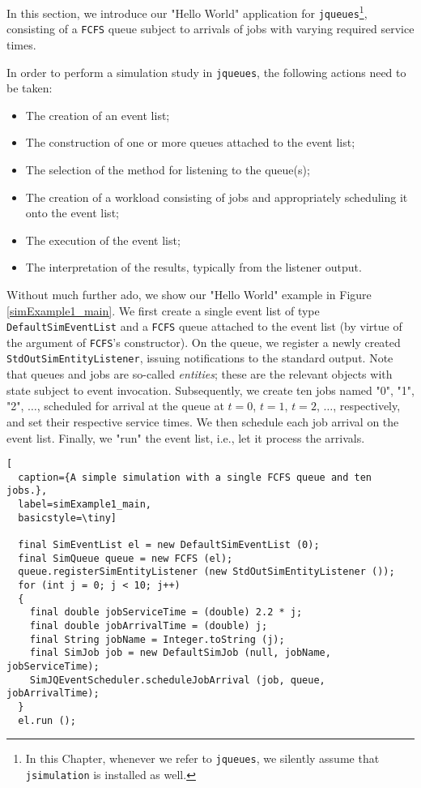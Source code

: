 In this section,
  we introduce our "Hello World" application for
  \lstinline|jqueues|\footnote{
  	In this Chapter,
  	whenever we refer to \texttt{jqueues},
  	we silently assume that \texttt{jsimulation}
  	is installed as well.},
  consisting of a \lstinline|FCFS| queue
  subject to arrivals of jobs with varying required service times.

In order to perform a simulation study in \lstinline|jqueues|,
  the following actions need to be taken:
\begin{itemize}
\item The creation of an event list;
\item The construction of one or more queues attached to the event list;
\item The selection of the method for listening to the queue(s);
\item The creation of a workload consisting of jobs
        and appropriately scheduling it onto the event list;
\item The execution of the event list;
\item The interpretation of the results,
        typically from the listener output.
\end{itemize}
Without much further ado,
  we show our "Hello World" example
  in Figure \ref{simExample1_main}.
We first create a single event list of type \lstinline|DefaultSimEventList|
  and a \lstinline|FCFS| queue attached to the event list
  (by virtue of the argument of \lstinline|FCFS|'s constructor).
On the queue, we register a newly created
  \lstinline|StdOutSimEntityListener|,
  issuing notifications to the standard output.
Note that queues and jobs are so-called {\em entities\/};
  these are the relevant objects with state subject to event invocation.
Subsequently,
  we create ten jobs named "0", "1", "2", $\ldots$,
  scheduled for arrival at the queue
  at $t=0$, $t=1$, $t=2$, $\ldots$,
  respectively,
  and set their respective service times.
We then schedule each job arrival on the event list.
Finally, we "run" the event list, i.e.,
  let it process the arrivals.

\begin{lstfloat}
\begin{lstlisting}[
  caption={A simple simulation with a single FCFS queue and ten jobs.},
  label=simExample1_main,
  basicstyle=\tiny]

  final SimEventList el = new DefaultSimEventList (0);
  final SimQueue queue = new FCFS (el);
  queue.registerSimEntityListener (new StdOutSimEntityListener ());
  for (int j = 0; j < 10; j++)
  {
    final double jobServiceTime = (double) 2.2 * j;
    final double jobArrivalTime = (double) j;
    final String jobName = Integer.toString (j);
    final SimJob job = new DefaultSimJob (null, jobName, jobServiceTime);
    SimJQEventScheduler.scheduleJobArrival (job, queue, jobArrivalTime);
  }
  el.run ();

\end{lstlisting}
\end{lstfloat}

